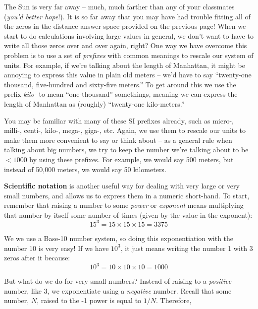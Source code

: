 \documentclass[12pt]{article}
\begin{document}
\clearpage

The Sun is very far away -- much, much farther than any of your classmates (\textit{you'd better hope}!). It is so far away that you may have had trouble fitting all of the zeros in the distance answer space provided on the previous page! When we start to do calculations involving large values in general, we don't want to have to write all those zeros over and over again, right? One way we have overcome this problem is to use a set of \textit{prefixes} with common meanings to rescale our system of units. For example, if we're talking about the length of Manhattan, it might be annoying to express this value in plain old meters -- we'd have to say ``twenty-one thousand, five-hundred and sixty-five meters.'' To get around this we use the prefix \textit{kilo-} to mean ``one-thousand'' somethings, meaning we can express the length of Manhattan as (roughly) ``twenty-one kilo-meters.''

You may be familiar with many of these SI prefixes already, such as micro-, milli-, centi-, kilo-, mega-, giga-, etc. Again, we use them to rescale our units to make them more convenient to say or think about -- as a general rule when talking about big numbers, we try to keep the number we're talking about to be $<1000$ by using these prefixes. For example, we would say 500 meters, but instead of 50,000 meters, we would say 50 kilometers.

\textbf{Scientific notation} is another useful way for dealing with very large or very small numbers, and allows us to express them in a numeric short-hand. To start, remember that raising a number to some \textit{power} or \textit{exponent} means multiplying that number by itself some number of times (given by the value in the exponent): 
\begin{equation*}
	15^3 = 15\times15\times15 = 3375
\end{equation*}

We we use a Base-10 number system, so doing this exponentiation with the number 10 is very easy! If we have $10^3$, it just means writing the number 1 with 3 zeros after it because:
\begin{equation*}
	10^3 = 10\times10\times10 = 1000
\end{equation*}

But what do we do for very small numbers? Instead of raising to a \textit{positive} number, like 3, we exponentiate using a \textit{negative} number. Recall that some number, $N$, raised to the -1 power is equal to $1/N$. Therefore,
\end{document}
